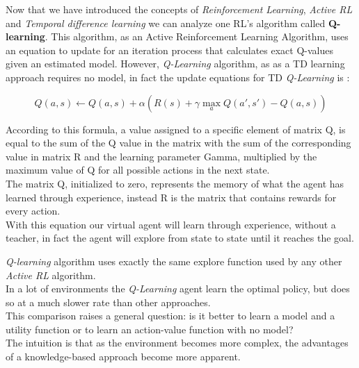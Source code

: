 \documentclass[]{report}
\begin{document}
Now that we have introduced the concepts of \emph{Reinforcement Learning}, \emph{Active RL} and \emph{Temporal difference learning} we can analyze one RL's algorithm called \textbf{Q-learning}.
This algorithm, as an Active Reinforcement Learning Algorithm, uses an equation to update for an iteration process that calculates exact Q-values given an estimated model.
However, \emph{Q-Learning} algorithm, as as a TD learning approach requires no model, in fact the update equations for TD \emph{Q-Learning} is :

\begin{equation*}
		Q(a,s) \leftarrow Q(a,s) + \alpha (R(s) + \gamma \max_a Q(a',s')-Q(a,s))
\end{equation*}

According to this formula, a value assigned to a specific element of matrix Q, is equal to the sum of the Q value in the matrix with the sum of the corresponding value in matrix R and the learning parameter Gamma, multiplied by the maximum value of Q for all possible actions in the next state.\\
The matrix Q, initialized to zero, represents the memory of what the agent has learned through experience, instead R is the matrix that contains rewards for every action.\\
With this equation our virtual agent will learn through experience, without a teacher, in fact the agent will explore from state to state until it reaches the goal.

\emph{Q-learning} algorithm uses exactly the same explore function used by any other \emph{Active RL} algorithm.\\
In a lot of environments the \emph{Q-Learning} agent learn the optimal policy, but does so at a much slower rate than other approaches.\\
This comparison raises a general question: is it better to learn a model and a utility function or to learn an action-value function with no model?\\
The intuition is that as the environment becomes more complex, the advantages of a knowledge-based approach become more apparent.

\newpage
\end{document}

